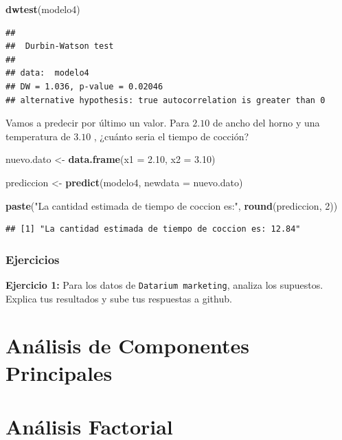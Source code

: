 \documentclass[
]{book}
\newenvironment{Shaded}{\begin{snugshade}}{\end{snugshade}}
\newcommand{\AttributeTok}[1]{\textcolor[rgb]{0.13,0.29,0.53}{#1}}
\newcommand{\DecValTok}[1]{\textcolor[rgb]{0.00,0.00,0.81}{#1}}
\newcommand{\FloatTok}[1]{\textcolor[rgb]{0.00,0.00,0.81}{#1}}
\newcommand{\FunctionTok}[1]{\textcolor[rgb]{0.13,0.29,0.53}{\textbf{#1}}}
\newcommand{\NormalTok}[1]{#1}
\newcommand{\OtherTok}[1]{\textcolor[rgb]{0.56,0.35,0.01}{#1}}
\newcommand{\StringTok}[1]{\textcolor[rgb]{0.31,0.60,0.02}{#1}}
\begin{document}
\begin{Shaded}
\begin{Highlighting}[]
\FunctionTok{dwtest}\NormalTok{(modelo4)}
\end{Highlighting}
\end{Shaded}

\begin{verbatim}
## 
##  Durbin-Watson test
## 
## data:  modelo4
## DW = 1.036, p-value = 0.02046
## alternative hypothesis: true autocorrelation is greater than 0
\end{verbatim}

Vamos a predecir por último un valor. Para \(2.10\) de ancho del horno y una temperatura de \(3.10\) , ¿cuánto seria el tiempo de cocción?

\begin{Shaded}
\begin{Highlighting}[]
\NormalTok{nuevo.dato }\OtherTok{\textless{}{-}} \FunctionTok{data.frame}\NormalTok{(}\AttributeTok{x1 =} \FloatTok{2.10}\NormalTok{, }\AttributeTok{x2 =} \FloatTok{3.10}\NormalTok{)}

\NormalTok{prediccion }\OtherTok{\textless{}{-}} \FunctionTok{predict}\NormalTok{(modelo4, }\AttributeTok{newdata =}\NormalTok{ nuevo.dato)}

\FunctionTok{paste}\NormalTok{(}\StringTok{"La cantidad estimada de tiempo de coccion es:"}\NormalTok{, }\FunctionTok{round}\NormalTok{(prediccion, }\DecValTok{2}\NormalTok{))}
\end{Highlighting}
\end{Shaded}

\begin{verbatim}
## [1] "La cantidad estimada de tiempo de coccion es: 12.84"
\end{verbatim}

\subsection{Ejercicios}\label{ejercicios-1}

\textbf{Ejercicio 1:} Para los datos de \texttt{Datarium\ marketing}, analiza los supuestos. Explica tus resultados y sube tus respuestas a github.

\chapter{Análisis de Componentes Principales}\label{anuxe1lisis-de-componentes-principales}

\chapter{Análisis Factorial}\label{anuxe1lisis-factorial}
\end{document}

